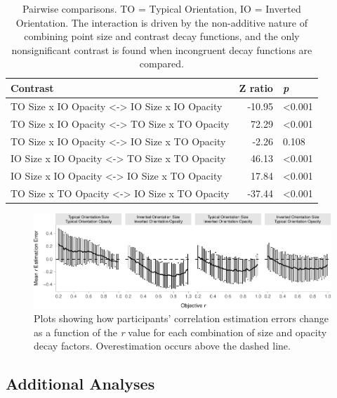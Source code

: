 \documentclass[manuscript, review, anonymous, screen]{acmart}
\begin{document}
\hypertarget{tbl-contrasts}{}
\begin{table}
\caption{\label{tbl-contrasts}Pairwise comparisons. TO = Typical Orientation, IO = Inverted
Orientation. The interaction is driven by the non-additive nature of
combining point size and contrast decay functions, and the only
nonsignificant contrast is found when incongruent decay functions are
compared. }\tabularnewline

\centering
\begin{tabular}{lrl}
\toprule
Contrast & Z ratio & \textit{p}\\
\midrule
TO Size x IO Opacity <-> IO Size x IO Opacity & -10.95 & <0.001\\
TO Size x IO Opacity <-> TO Size x TO Opacity & 72.29 & <0.001\\
TO Size x IO Opacity <-> IO Size x TO Opacity & -2.26 & 0.108\\
IO Size x IO Opacity <-> TO Size x TO Opacity & 46.13 & <0.001\\
IO Size x IO Opacity <-> IO Size x TO Opacity & 17.84 & <0.001\\
TO Size x TO Opacity <-> IO Size x TO Opacity & -37.44 & <0.001\\
\bottomrule
\end{tabular}
\end{table}

\begin{figure}

{\centering \includegraphics[width=1\textwidth,height=\textheight]{size_and_opacity_files/figure-pdf/fig-diff-error-bars-plot-1.pdf}

}

\caption{\label{fig-diff-error-bars-plot}Plots showing how participants'
correlation estimation errors change as a function of the \emph{r} value
for each combination of size and opacity decay factors. Overestimation
occurs above the dashed line.}

\end{figure}

\hypertarget{sec-add-analyses}{%
\subsection{Additional Analyses}\label{sec-add-analyses}}
\end{document}
